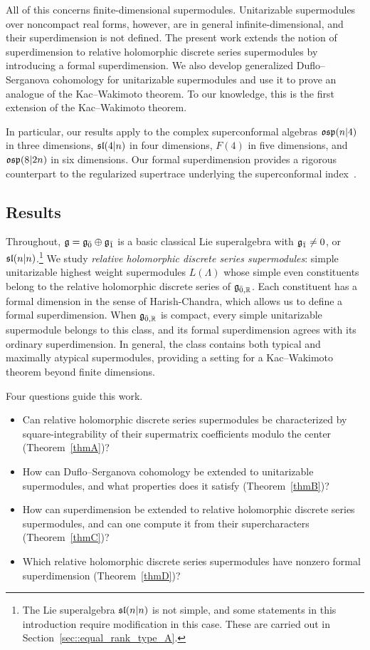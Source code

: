 All of this concerns finite-dimensional supermodules. Unitarizable
supermodules over noncompact real forms, however, are in general
infinite-dimensional, and their superdimension is not defined. The present work extends the notion of superdimension to relative holomorphic discrete series supermodules by introducing a formal superdimension. We also develop generalized Duflo--Serganova cohomology for unitarizable supermodules and use it to prove an analogue of the Kac--Wakimoto theorem. To our knowledge, this is
the first extension of the Kac--Wakimoto theorem. 

In particular, our results apply to the complex superconformal
algebras $\osp(n\vert4)$ in three dimensions, $\sl(4\vert n)$ in four dimensions, $F(4)$ in five
dimensions, and $\osp(8\vert2n)$ in six dimensions. Our formal
superdimension provides a rigorous counterpart to the regularized supertrace
underlying the superconformal index~\cite{romelsberger2006counting,
kinney2007index,SchmidtWalcher}.


\subsection{Results}
\label{subsec::results}
Throughout, $\gg=\even\oplus\odd$ is a basic classical Lie superalgebra with $\odd\neq0$, or $\sl(n\vert n)$.\footnote{The Lie superalgebra $\sl(n\vert n)$ is not simple, and some statements in this introduction require modification in this case. These are carried out in Section~\ref{sec::equal_rank_type_A}.} We study \emph{relative holomorphic discrete series supermodules}: simple unitarizable highest weight supermodules $L(\Lambda)$ whose simple even constituents belong to the relative holomorphic discrete series of $\gg_{\bar0,\RR}$. Each constituent has a formal dimension in the sense of Harish-Chandra, which allows us to define a formal superdimension. When $\gg_{\bar0,\RR}$ is compact, every simple unitarizable supermodule belongs to this class, and its formal superdimension agrees with its ordinary superdimension. In general, the class contains both typical and maximally atypical supermodules, providing a setting for a Kac--Wakimoto theorem beyond finite dimensions.

Four questions guide this work.
\begin{itemize}
\item Can relative holomorphic discrete series supermodules be characterized by square-integrability of their supermatrix coefficients modulo the center (Theorem~\ref{thmA})?
\item How can Duflo--Serganova cohomology be extended to unitarizable supermodules, and what properties does it satisfy (Theorem~\ref{thmB})?
\item How can superdimension be extended to relative holomorphic discrete series supermodules, and can one compute it from their supercharacters (Theorem~\ref{thmC})?
\item Which relative holomorphic discrete series supermodules have nonzero formal superdimension (Theorem~\ref{thmD})?
\end{itemize}

